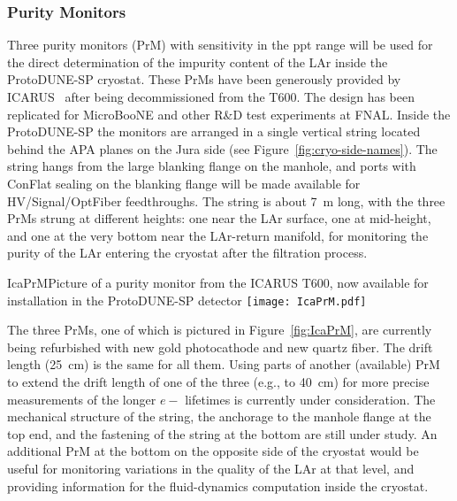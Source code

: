 \subsubsection{Purity Monitors} 
Three purity monitors (PrM) with sensitivity in the ppt range will be used for the direct determination of the impurity content of the LAr inside the ProtoDUNE-SP cryostat. These PrMs have been generously provided by ICARUS~\cite{Ica-PrM-TM} 
after being decommissioned from the T600. The design has been replicated for MicroBooNE and other R\&D test experiments at FNAL. Inside the ProtoDUNE-SP the monitors are arranged in a single vertical string located behind the APA planes on the Jura side (see Figure~\ref{fig:cryo-side-names}). The string hangs from the large blanking flange on the manhole, and ports with ConFlat sealing on the blanking flange will be made available for HV/Signal/OptFiber feedthroughs. The string is about 7~m long, with the three PrMs strung at different heights: one near the LAr surface, one at mid-height, and one at the very bottom near the LAr-return manifold, %
for monitoring the purity of the LAr entering the cryostat after the filtration process.  

\begin{cdrfigure}{IcaPrM}{Picture of a purity monitor from the ICARUS T600, now available for installation in the ProtoDUNE-SP detector}
\texttt{[image: IcaPrM.pdf]} 
\end{cdrfigure}


The three PrMs, one of which is pictured in Figure~\ref{fig:IcaPrM}, are currently being refurbished with new gold photocathode and new quartz fiber. The drift length  (25~cm) is the same for all them. Using parts of another (available) PrM to extend the drift length of one of the three (e.g., to 40~cm) for more precise measurements of the longer $e-$ lifetimes is currently %
under consideration.
The mechanical structure of the string, the anchorage to the manhole flange at the top end, and the fastening of the string at the bottom %
are still under study.
An additional PrM at the bottom on the opposite side of the cryostat would be useful for %
monitoring variations in the quality of 
the LAr at that level, and providing information for the fluid-dynamics computation inside the cryostat. \\

